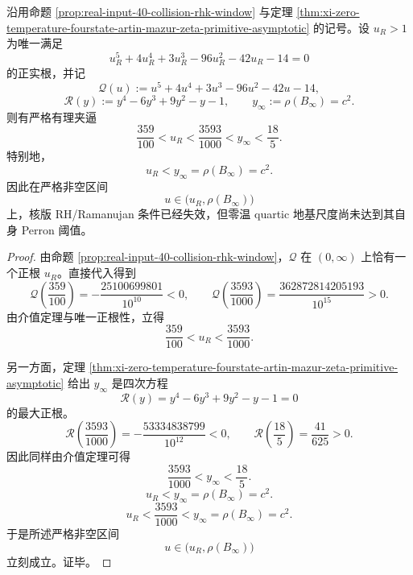 \begin{theorem}\label{thm:xi-real-input-rh-window-zero-temp-perron-gap}
沿用命题 \ref{prop:real-input-40-collision-rhk-window} 与定理 \ref{thm:xi-zero-temperature-fourstate-artin-mazur-zeta-primitive-asymptotic} 的记号。设 \(u_R>1\) 为唯一满足
\[
u_R^5+4u_R^4+3u_R^3-96u_R^2-42u_R-14=0
\]
的正实根，并记
\[
\mathcal Q(u):=u^5+4u^4+3u^3-96u^2-42u-14,
\]
\[
\mathcal R(y):=y^4-6y^3+9y^2-y-1,
\qquad
y_\infty:=\rho(B_\infty)=c^2.
\]
则有严格有理夹逼
\[
\boxed{\;
\frac{359}{100}<u_R<\frac{3593}{1000}<y_\infty<\frac{18}{5}.\;}
\]
特别地，
\[
\boxed{\;
u_R<y_\infty=\rho(B_\infty)=c^2.
\;}
\]
因此在严格非空区间
\[
u\in\bigl(u_R,\rho(B_\infty)\bigr)
\]
上，核版 RH/Ramanujan 条件已经失效，但零温 quartic 地基尺度尚未达到其自身 Perron 阈值。
\end{theorem}
\begin{proof}
由命题 \ref{prop:real-input-40-collision-rhk-window}，\(\mathcal Q\) 在 \((0,\infty)\) 上恰有一个正根 \(u_R\)。直接代入得到
\[
\mathcal Q\!\left(\frac{359}{100}\right)
=
-\frac{25100699801}{10^{10}}<0,
\qquad
\mathcal Q\!\left(\frac{3593}{1000}\right)
=
\frac{362872814205193}{10^{15}}>0.
\]
由介值定理与唯一正根性，立得
\[
\frac{359}{100}<u_R<\frac{3593}{1000}.
\]

另一方面，定理 \ref{thm:xi-zero-temperature-fourstate-artin-mazur-zeta-primitive-asymptotic} 给出 \(y_\infty\) 是四次方程
\[
\mathcal R(y)=y^4-6y^3+9y^2-y-1=0
\]
的最大正根。
\[
\mathcal R\!\left(\frac{3593}{1000}\right)
=
-\frac{53334838799}{10^{12}}<0,
\qquad
\mathcal R\!\left(\frac{18}{5}\right)
=
\frac{41}{625}>0.
\]
因此同样由介值定理可得
\[
\frac{3593}{1000}<y_\infty<\frac{18}{5}.
\]
\[
u_R<y_\infty=\rho(B_\infty)=c^2.
\]
\[
u_R<\frac{3593}{1000}<y_\infty=\rho(B_\infty)=c^2.
\]
于是所述严格非空区间
\[
u\in\bigl(u_R,\rho(B_\infty)\bigr)
\]
立刻成立。证毕。
\end{proof}

